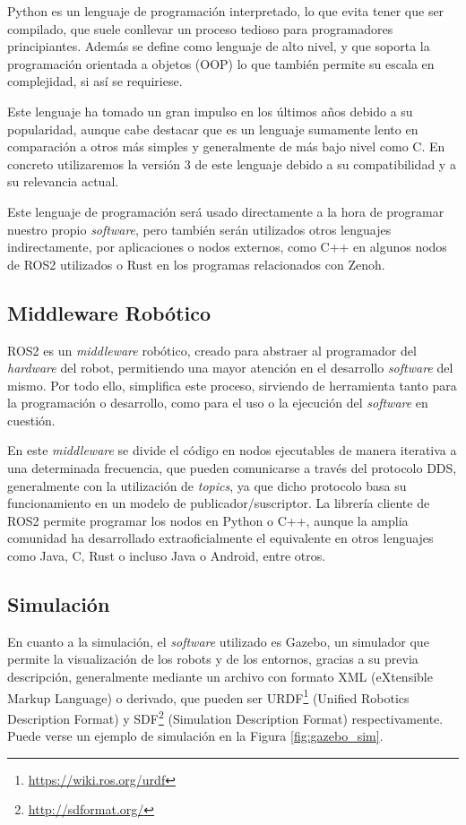 Python es un lenguaje de programación interpretado, lo que evita tener que ser
compilado, que suele conllevar un proceso tedioso para programadores
principiantes.
Además se define como lenguaje de alto nivel, y que soporta la programación
orientada a objetos (OOP) lo que también permite su escala en complejidad, si
así se requiriese.

Este lenguaje ha tomado un gran impulso en los últimos años debido a su
popularidad, aunque cabe destacar que es un lenguaje sumamente lento en
comparación a otros más simples y generalmente de más bajo nivel como C.
En concreto utilizaremos la versión 3 de este lenguaje debido a su
compatibilidad y a su relevancia actual.

Este lenguaje de programación será usado directamente a la hora de programar
nuestro propio \textit{software}, pero también serán utilizados otros lenguajes
indirectamente, por aplicaciones o nodos externos, como C++ en algunos nodos de
ROS2 utilizados o Rust en los programas relacionados con Zenoh.


\subsection{Middleware Robótico}
\label{sec:middleware_robotico}

ROS2 es un \textit{middleware} robótico, creado para abstraer al programador del
\textit{hardware} del robot, permitiendo una mayor atención en el desarrollo
\textit{software} del mismo.
Por todo ello, simplifica este proceso, sirviendo de herramienta tanto para la
programación o desarrollo, como para el uso o la ejecución del \textit{software}
en cuestión.

En este \textit{middleware} se divide el código en nodos ejecutables de manera
iterativa a una determinada frecuencia, que pueden comunicarse a través del
protocolo DDS, generalmente con la utilización de \textit{topics}, ya que dicho
protocolo basa su funcionamiento en un modelo de publicador/suscriptor.
La librería cliente de ROS2 permite programar los nodos en Python o C++, aunque
la amplia comunidad ha desarrollado extraoficialmente el equivalente en otros
lenguajes como Java, C, Rust o incluso Java o Android, entre otros.


\subsection{Simulación}
\label{sec:simulacion}

En cuanto a la simulación, el \textit{software} utilizado es Gazebo, un
simulador que permite la visualización de los robots y de los entornos, gracias
a su previa descripción, generalmente mediante un archivo con formato XML
(eXtensible Markup Language) o derivado, que pueden ser
URDF\footnote{\url{https://wiki.ros.org/urdf}} (Unified Robotics Description
Format) y SDF\footnote{\url{http://sdformat.org/}} (Simulation Description
Format) respectivamente.
Puede verse un ejemplo de simulación en la Figura \ref{fig:gazebo_sim}.


